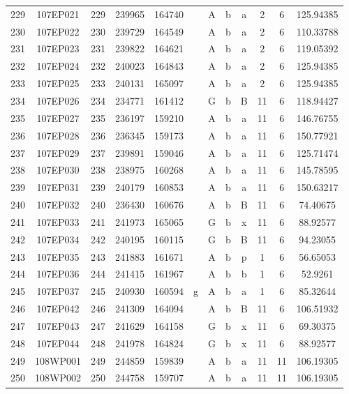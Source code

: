 \begin{tabular}{|*{12}{c|}}
229 & 107EP021 & 229 & 239965 & 164740 &  & A & b & a & 2 & 6 & 125.94385 \\ 
230 & 107EP022 & 230 & 239729 & 164549 &  & A & b & a & 2 & 6 & 110.33788 \\ 
231 & 107EP023 & 231 & 239822 & 164621 &  & A & b & a & 2 & 6 & 119.05392 \\ 
232 & 107EP024 & 232 & 240023 & 164843 &  & A & b & a & 2 & 6 & 125.94385 \\ 
233 & 107EP025 & 233 & 240131 & 165097 &  & A & b & a & 2 & 6 & 125.94385 \\ 
234 & 107EP026 & 234 & 234771 & 161412 &  & G & b & B & 11 & 6 & 118.94427 \\ 
235 & 107EP027 & 235 & 236197 & 159210 &  & A & b & a & 11 & 6 & 146.76755 \\ 
236 & 107EP028 & 236 & 236345 & 159173 &  & A & b & a & 11 & 6 & 150.77921 \\ 
237 & 107EP029 & 237 & 239891 & 159046 &  & A & b & a & 11 & 6 & 125.71474 \\ 
238 & 107EP030 & 238 & 238975 & 160268 &  & A & b & a & 11 & 6 & 145.78595 \\ 
239 & 107EP031 & 239 & 240179 & 160853 &  & A & b & a & 11 & 6 & 150.63217 \\ 
240 & 107EP032 & 240 & 236430 & 160676 &  & A & b & B & 11 & 6 & 74.40675 \\ 
241 & 107EP033 & 241 & 241973 & 165065 &  & G & b & x & 11 & 6 & 88.92577 \\ 
242 & 107EP034 & 242 & 240195 & 160115 &  & G & b & B & 11 & 6 & 94.23055 \\ 
243 & 107EP035 & 243 & 241883 & 161671 &  & A & b & p & 1 & 6 & 56.65053 \\ 
244 & 107EP036 & 244 & 241415 & 161967 &  & A & b & b & 1 & 6 & 52.9261 \\ 
245 & 107EP037 & 245 & 240930 & 160594 & g & A & b & a & 1 & 6 & 85.32644 \\ 
246 & 107EP042 & 246 & 241309 & 164094 &  & A & b & B & 11 & 6 & 106.51932 \\ 
247 & 107EP043 & 247 & 241629 & 164158 &  & G & b & x & 11 & 6 & 69.30375 \\ 
248 & 107EP044 & 248 & 241978 & 164824 &  & G & b & x & 11 & 6 & 88.92577 \\ 
249 & 108WP001 & 249 & 244859 & 159839 &  & A & b & a & 11 & 11 & 106.19305 \\ 
250 & 108WP002 & 250 & 244758 & 159707 &  & A & b & a & 11 & 11 & 106.19305 \\ 

\end{tabular}
